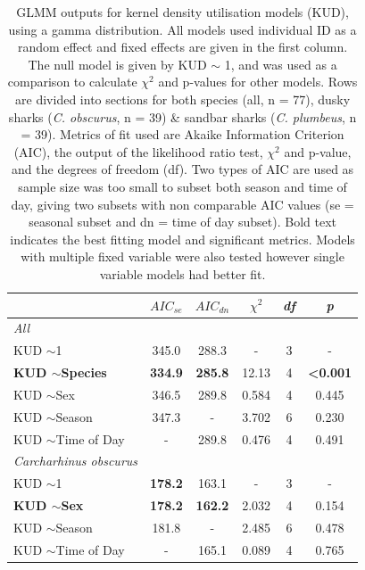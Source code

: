 \documentclass[11pt,a4paper]{article}
\begin{document}
	\begin{table}[h!]
		\caption{GLMM outputs for kernel density utilisation models (KUD), using a gamma distribution. All models used individual ID as a random effect and fixed effects are given in the first column. The null model is given by KUD $\sim$ 1, and was used as a comparison to calculate $\chi^2$ and p-values for other models. Rows are divided into sections for both species (all, n = 77), dusky sharks (\textit{C. obscurus}, n = 39) \& sandbar sharks (\textit{C. plumbeus}, n = 39). Metrics of fit used are Akaike Information Criterion (AIC), the output of the likelihood ratio test, $\chi^2$ and p-value, and the degrees of freedom (df). Two types of AIC are used as sample size was too small to subset both season and time of day, giving two subsets with non comparable AIC values (se = seasonal subset and dn = time of day subset). Bold text indicates the best fitting model and significant metrics. Models with multiple fixed variable were also tested however single variable models had better fit.}
		\centering
		\begin{tabular}{@{}lccccc@{}}
			& $AIC_{se}$ & $AIC_{dn}$ & $\chi^2$  & \textit{df} & \textit{p}               \\ \midrule
			\textit{All}                   &       &       &       &    &                 \\
			KUD $\sim$1                    & 345.0 & 288.3 & -     & 3  & -               \\
			\textbf{KUD $\sim$Species}              & \textbf{334.9} & \textbf{285.8} & 12.13 & 4  & \textbf{\textless 0.001} \\
			KUD $\sim$Sex                  & 346.5 & 289.8 & 0.584 & 4  & 0.445           \\
			KUD $\sim$Season               & 347.3 & -     & 3.702 & 6  & 0.230           \\
			KUD $\sim$Time of Day          & -     & 289.8 & 0.476 & 4  & 0.491           \\ \midrule
			\textit{Carcharhinus obscurus} &       &       &       &    &                 \\
			KUD $\sim$1                    & \textbf{178.2} & 163.1 & -     & 3  & -               \\
			\textbf{KUD $\sim$Sex}                  & \textbf{178.2} & \textbf{162.2} & 2.032 & 4  & 0.154           \\
			KUD $\sim$Season               & 181.8 & -     & 2.485 & 6  & 0.478           \\
			KUD $\sim$Time of Day          & -     & 165.1 & 0.089 & 4  & 0.765           \\

\end{tabular}
\end{table}
\end{document}
